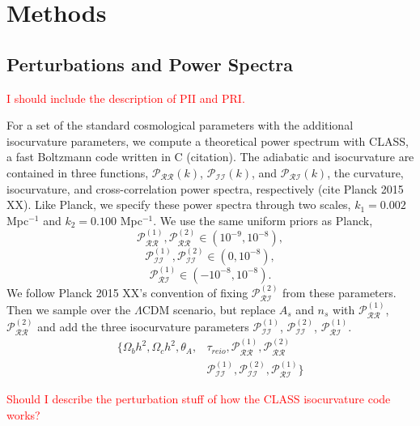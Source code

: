 \documentclass[11pt,a4paper]{emulateapj}
\newcommand\writingnote[1]{\textcolor{red}{#1}}
\begin{document}
\section{Methods}

\subsection{Perturbations and Power Spectra}
\writingnote{
I should include the description of PII and PRI.
}


For a set of the standard cosmological parameters with the additional isocurvature parameters, we compute a theoretical power spectrum with CLASS, a fast Boltzmann code written in C (citation). The adiabatic and isocurvature are contained in three functions, $\mathcal{P}_{\mathcal{RR}}(k)$, $\mathcal{P}_{\mathcal{II}}(k)$, and $\mathcal{P}_{\mathcal{RI}}(k)$, the curvature, isocurvature, and cross-correlation power spectra, respectively (cite Planck 2015 XX). Like Planck, we specify these power spectra through two scales, $k_1 = 0.002$ Mpc$^{-1}$ and $k_2 = 0.100$ Mpc$^{-1}$. We use the same uniform priors as Planck,
\begin{equation}
    \mathcal{P}_{\mathcal{RR}}^{(1)}, \mathcal{P}_{\mathcal{RR}}^{(2)} \in (10^{-9}, 10^{-8}),
\end{equation}
\begin{equation}
    \mathcal{P}_{\mathcal{II}}^{(1)}, \mathcal{P}_{\mathcal{II}}^{(2)} \in (0, 10^{-8}),
\end{equation}
\begin{equation}
    \mathcal{P}_{\mathcal{RI}}^{(1)} \in (-10^{-8}, 10^{-8}).
\end{equation}
We follow Planck 2015 XX's convention of fixing $\mathcal{P}_{\mathcal{RI}}^{(2)}$ from these parameters. Then we sample over the $\Lambda$CDM scenario, but replace $A_s$ and $n_s$ with $\mathcal{P}_{\mathcal{RR}}^{(1)}$,  $\mathcal{P}_{\mathcal{RR}}^{(2)}$ and add the three isocurvature parameters $\mathcal{P}_{\mathcal{II}}^{(1)}$, $\mathcal{P}_{\mathcal{II}}^{(2)}$, $\mathcal{P}_{\mathcal{RI}}^{(1)}$.
\begin{align}
\{ \Omega_b h^2, \Omega_c h^2, \theta_A, &\tau_{reio}, \mathcal{P}_{\mathcal{RR}}^{(1)}, \mathcal{P}_{\mathcal{RR}}^{(2)} \\
& \mathcal{P}_{\mathcal{II}}^{(1)}, \mathcal{P}_{\mathcal{II}}^{(2)}, \mathcal{P}_{\mathcal{RI}}^{(1)}    \}
\end{align}

\writingnote{Should I describe the perturbation stuff of how the CLASS isocurvature code works?}
\end{document}
